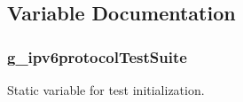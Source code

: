 \subsection{Variable Documentation}
\subsubsection[{\texorpdfstring{g\+\_\+ipv6protocol\+Test\+Suite}{g_ipv6protocolTestSuite}}]{ g\+\_\+ipv6protocol\+Test\+Suite\hspace{0.3cm}{\ttfamily [static]}}\hypertarget{ipv6-test_8cc_a78b6652ce5676068fcc94b576d378659}{}\label{ipv6-test_8cc_a78b6652ce5676068fcc94b576d378659}


Static variable for test initialization. 

